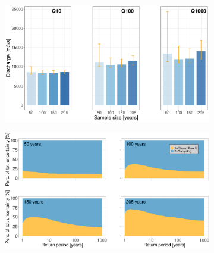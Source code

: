 \documentclass[11pt]{article}
\begin{document}
\begin{figure}[p]
            \centering
            \begin{subfigure}{0.49\linewidth}
                \centering
                \includegraphics[width=1\linewidth]{Figs/11a-BarplotQuantiles4cases.pdf}
                \caption{}
                \label{subfig:BarplotQuantilesGev}
            \end{subfigure}
            \begin{subfigure}{.49\textwidth}
                \centering  
                \includegraphics[width=\linewidth]{Figs/11b-Ukplot4cases.pdf}
                \caption{}
                \label{subfig:UKplot4cases}
            \end{subfigure}
            

\end{figure}
\end{document}

